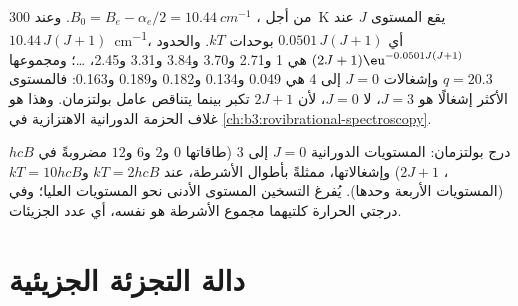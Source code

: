 \begin{example}\label{ex:b3:partition-functions:hcl}
من أجل ، $B_0 = B_e - \alpha_e/2 = \qty{10.44}{cm^{-1}}$. وعند \qty{300}{K} يقع المستوى $J$
عند $10.44\,J(J+1)$~\unit{cm^{-1}}، أي $0.0501\,J(J+1)$ بوحدات $kT$. والحدود
$(2J+1)\eu^{-0.0501J(J+1)}$ هي 1 و2.71 و3.70 و3.84 و3.31 و2.45، \dots؛ ومجموعها
$q = 20.3$ وإشغالات $J = 0$ إلى 4 هي 0.049 و0.134 و0.182 و0.189 
و0.163: فالمستوى الأكثر إشغالًا هو $J = 3$، لا $J = 0$، لأن 
$2J + 1$ تكبر بينما يتناقص عامل بولتزمان. وهذا هو غلاف
الحزمة الدورانية الاهتزازية في \cref{ch:b3:rovibrational-spectroscopy}.
\end{example}

\begin{omfigure}

{\small درج بولتزمان: المستويات الدورانية $J = 0$ إلى 3 (طاقاتها $0$ و$2$ و$6$
و$12$ مضروبةً في $hcB$،  $2J + 1$) وإشغالاتها، ممثلةً بأطوال الأشرطة،
عند $kT = 2hcB$ و$kT = 10hcB$ (المستويات الأربعة وحدها). يُفرغ التسخين
المستوى الأدنى نحو المستويات العليا؛ وفي درجتي الحرارة كلتيهما مجموع الأشرطة
هو نفسه، أي عدد الجزيئات.}
\end{omfigure}

\section{دالة التجزئة الجزيئية}

